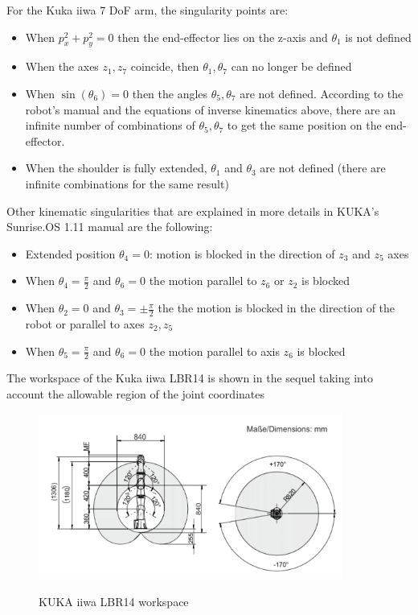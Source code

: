 For the Kuka iiwa 7 DoF arm, the singularity points are:
\begin{itemize}
	\item When $p_x^2 + p_y^2 = 0$ then the end-effector lies on the z-axis and $θ_1$ is not defined
	\item When the axes $z_1,z_7$ coincide, then $θ_1,θ_7$ can no longer be defined
	\item When $\sin\left( θ_6 \right) = 0$ then the angles $θ_5, θ_7$ are not defined. According to the robot's manual and the equations of inverse kinematics above, there are an infinite number of combinations of
	$θ_5, θ_7$ to get the same position on the end-effector.
	\item When the shoulder is fully extended, $θ_1$ and $θ_3$ are not defined (there are infinite combinations for the same result)
\end{itemize}
Other kinematic singularities that are explained in more details in KUKA's Sunrise.OS 1.11 manual are the following:
\begin{itemize}
	\item Extended position $θ_4 = 0$: motion is blocked in the direction of $z_3$ and $z_5$ axes
	\item When $θ_4 = \frac{π}{2}$ and $θ_6 = 0$ the motion parallel to $z_6$ or $z_2$ is blocked
	\item When $θ_2 = 0$ and $θ_3 = \pm \frac{π}{2}$ the the motion is blocked in the direction of the robot or parallel to axes $z_2,z_5$
	\item When $θ_5 = \frac{π}{2}$ and $θ_6 = 0$ the motion parallel to axis $z_6$ is blocked
\end{itemize}
The workspace of the Kuka iiwa LBR14 is shown in the sequel taking into account the allowable region of the joint coordinates

\begin{figure}[htbp]
\centering
\includegraphics[width=10cm]{images/iiwa-workspace.png}\\
\caption{KUKA iiwa LBR14 workspace}
\end{figure}

